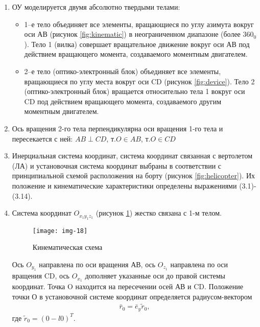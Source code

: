 \begin{enumerate}
	\item ОУ моделируется двумя абсолютно твердыми телами:
	\begin{itemize}
		\item 1–е тело объединяет все элементы, вращающиеся по углу азимута вокруг оси АВ (рисунок \ref{fig:kinematic}) в неограниченном диапазоне (более $360_0$). Тело 1 (вилка) совершает вращательное движение вокруг оси АВ под действием вращающего момента, создаваемого моментным двигателем.
		\item 2–е тело (оптико-электронный блок) объединяет все элементы, вращающиеся по углу места вокруг оси CD (рисунок \ref{fig:device}). Тело 2 (оптико-электронный блок) вращается относительно тела 1 вокруг оси CD под действием вращающего момента, создаваемого другим моментным двигателем.
	\end{itemize}
	\item Ось вращения 2-го тела перпендикулярна оси вращения 1-го тела и пересекается с ней: $AB\perp CD$, т.$O \in AB$, т.$O \in CD$
	\item Инерциальная система координат, система координат связанная с вертолетом (ЛА) и установочная система координат выбраны в соответствии с принципиальной схемой расположения на борту (рисунок \ref{fig:helicopter}). Их положение и кинематические характеристики  определены выражениями (3.1)-(3.14).
	\item Система координат $O_{x_1y_1z_1}$ (рисунок \ref{fig:coord/3.4}) жестко связана с 1-м телом. 
	\begin{figure}[ht]
		\centering
		\texttt{[image: img-18]} 
		\caption{Кинематическая схема}
		\label{fig:coord/3.4}
	\end{figure}

	Ось $O_{y_1}$ направлена по оси вращения АВ, ось $O_{z_1}$ направлена по оси вращения CD, ось $O_{x_1}$ дополняет указанные оси до правой системы координат. Точка O находится на пересечении осей АВ и CD. Положение точки О в установочной системе координат определяется радиусом-вектором
	\begin{equation}
	\label{eq:p3:1}
	\begin{alignedat}{2}
	\bar{r}_0 = \bar{e}_y\tilde{r}_0 ,
	\end{alignedat}
	\end{equation}
	где $\tilde{r}_0 = (0 -l 0)^T$.
	

\end{enumerate}
